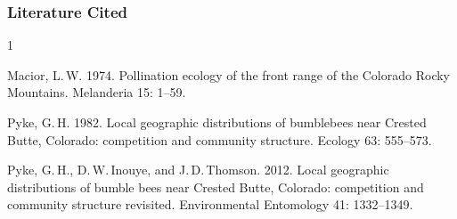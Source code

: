 \documentclass[12pt, hidelinks]{exam}
\begin{document}
\subsubsection*{Literature Cited}

\begin{hangparas}{\leftmargin}{1}

Macior, L.\,W. 1974. Pollination ecology of the front
range of the Colorado Rocky Mountains. Melanderia 15: 1–59.

Pyke, G.\,H. 1982. Local geographic distributions of bumblebees 
near Crested Butte, Colorado: competition and community structure.
Ecology 63: 555–573.

Pyke, G.\,H., D.\,W.\,Inouye, and J.\,D.\,Thomson. 2012. Local geographic distributions of bumble bees near Crested Butte, Colorado: competition and community structure revisited. Environmental Entomology 41: 1332–1349.

\end{hangparas}
\end{document}

